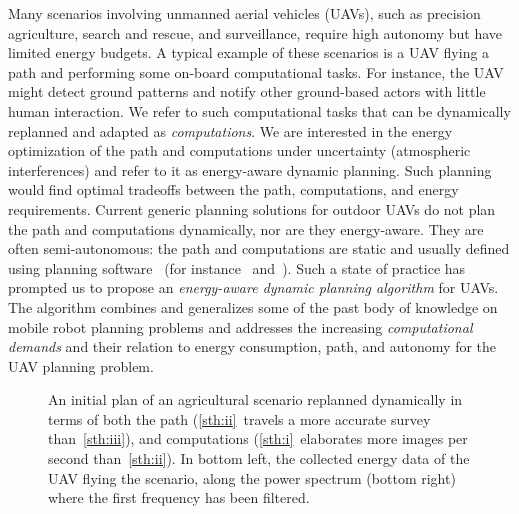 \documentclass[letterpaper,10pt,conference]{ieeeconf}
\newcommand{\figpath}{./figures}
\theoremstyle{definition}
\begin{document}
Many scenarios involving unmanned aerial vehicles (UAVs), such as precision agriculture, search and rescue, and surveillance, require high autonomy but have limited energy budgets. A typical example of these scenarios is a UAV flying a path and performing some on-board computational tasks. For instance, the UAV might detect ground patterns and notify other ground-based actors with little human interaction. We refer to such computational tasks that can be dynamically replanned and adapted as \emph{computations}. We are interested in the energy optimization of the path and computations under uncertainty (atmospheric interferences) and refer to it as energy-aware dynamic planning. Such planning would find optimal tradeoffs between the path, computations, and energy requirements. Current generic planning solutions for outdoor UAVs do not plan the path and computations dynamically, nor are they energy-aware. They are often semi-autonomous: the path and computations are static and usually defined using planning software~\cite{daponte2019review} (for instance~\cite{papa} and~\cite{px4}). Such a state of practice has prompted us to propose an \emph{energy-aware dynamic planning algorithm} for UAVs. The algorithm combines and generalizes some of the past body of knowledge on mobile robot planning problems and addresses the increasing \emph{computational demands} and their relation to energy consumption, path, and autonomy for the UAV planning problem.

\begin{figure}[t]
  \centering
  \caption{An initial plan of an agricultural scenario replanned dynamically in terms of both the path (\ref{sth:ii}~travels a more accurate survey than~\ref{sth:iii}), and computations (\ref{sth:i}~elaborates more images per second than~\ref{sth:ii}). In bottom left, the collected energy data of the UAV flying the scenario, along the power spectrum (bottom right) where the first frequency has been filtered.}
  \label{fig:il-abs}
\end{figure}
\end{document}
